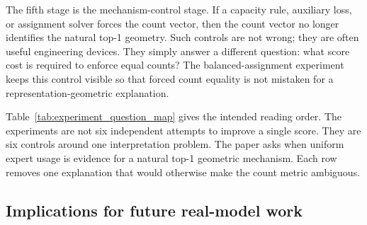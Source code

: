 The fifth stage is the mechanism-control stage. If a capacity rule, auxiliary
loss, or assignment solver forces the count vector, then the count vector no
longer identifies the natural top-1 geometry. Such controls are not wrong; they
are often useful engineering devices. They simply answer a different question:
what score cost is required to enforce equal counts? The balanced-assignment
experiment keeps this control visible so that forced count equality is not
mistaken for a representation-geometric explanation.

\begin{table}[t]
\centering
\caption{Experiment-to-question map. Each experiment removes one nearby
overinterpretation.}
\label{tab:experiment_question_map}
\small
\setlength{\tabcolsep}{3pt}
\end{table}

Table~\ref{tab:experiment_question_map} gives the intended reading order. The
experiments are not six independent attempts to improve a single score. They are
six controls around one interpretation problem. The paper asks when uniform
expert usage is evidence for a natural top-1 geometric mechanism. Each row
removes one explanation that would otherwise make the count metric ambiguous.

\subsection{Implications for future real-model work}

